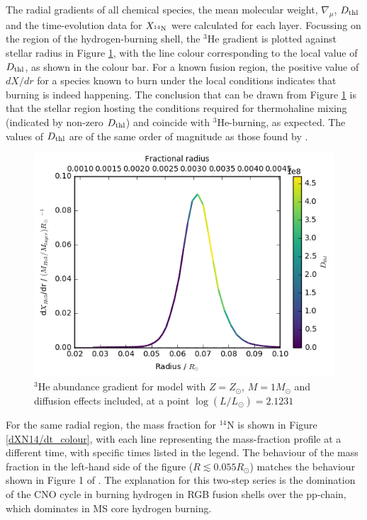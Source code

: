 \documentclass[12pt, a4paper]{report}
\begin{document}
The radial gradients of all chemical species, the mean molecular weight, $\nabla_{\mu}$,  $D_{\textnormal{thl}}$ and the time-evolution data for $X_{^{14}\textnormal{N}}$ were calculated for each layer. Focussing on the region of the hydrogen-burning shell, the $^{3}$He gradient is plotted against stellar radius in Figure \ref{dHe3/dr_colour}, with the line colour corresponding to the local value of $D_{\textnormal{thl}}$, as shown in the colour bar. For a known fusion region, the positive value of $dX/dr$ for a species known to burn under the local conditions indicates that burning is indeed happening.  The conclusion that can be drawn from Figure \ref{dHe3/dr_colour} is that the stellar region hosting the conditions required for thermohaline mixing (indicated by non-zero $D_{\textnormal{thl}}$) and coincide with $^{3}$He-burning, as expected. The values of $D_{\textnormal{thl}}$ are of the same order of magnitude as those found by \cite{2015MNRAS.446.2673L}.

\begin{figure}
\begin{center}
\includegraphics[scale=0.7]{../mu_test_data/mu_test_graphs/eq_logL=2p1231_He3_radius_gradient_Dthl_color_crop.png}
\caption{$^{3}$He abundance gradient for model with $Z = Z_{\odot}$, $M = 1M_{\odot}$ and diffusion effects included, at a point $\log(L/L_{\odot}) = 2.1231$}
\label{dHe3/dr_colour}
\end{center}
\end{figure}

For the same radial region, the mass fraction for $^{14}$N is shown in Figure \ref{dXN14/dt_colour}, with each line representing the mass-fraction profile at a different time, with specific times listed in the legend. The behaviour of the mass fraction in the left-hand side of the figure ($R \lesssim 0.055R_{\odot}$) matches the behaviour shown in Figure 1 of \cite{2007A&A...467L..15C}. The explanation for this two-step series is the domination of the CNO cycle in burning hydrogen in RGB fusion shells over the pp-chain, which dominates in MS core hydrogen burning. 
\end{document}
